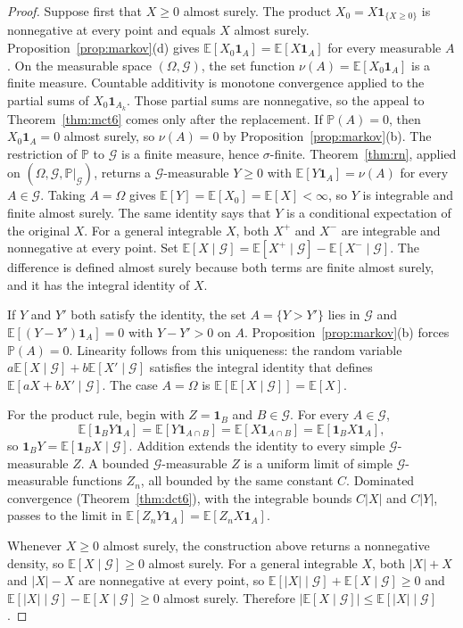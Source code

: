 \begin{proof}
Suppose first that $X\ge0$ almost surely. The product $X_0=X\mathbf 1_{\{X\ge0\}}$ is nonnegative at every point and equals $X$ almost surely. Proposition~\ref{prop:markov}(d) gives $\mathbb E[X_0\mathbf 1_A]=\mathbb E[X\mathbf 1_A]$ for every measurable $A$. On the measurable space $(\Omega,\mathcal G)$, the set function $\nu(A)=\mathbb E[X_0\mathbf 1_A]$ is a finite measure. Countable additivity is monotone convergence applied to the partial sums of $X_0\mathbf 1_{A_k}$. Those partial sums are nonnegative, so the appeal to Theorem~\ref{thm:mct6} comes only after the replacement. If $\mathbb P(A)=0$, then $X_0\mathbf 1_A=0$ almost surely, so $\nu(A)=0$ by Proposition~\ref{prop:markov}(b). The restriction of $\mathbb P$ to $\mathcal G$ is a finite measure, hence $\sigma$-finite. Theorem~\ref{thm:rn}, applied on $(\Omega,\mathcal G,\mathbb P|_{\mathcal G})$, returns a $\mathcal G$-measurable $Y\ge0$ with $\mathbb E[Y\mathbf 1_A]=\nu(A)$ for every $A\in\mathcal G$. Taking $A=\Omega$ gives $\mathbb E[Y]=\mathbb E[X_0]=\mathbb E[X]<\infty$, so $Y$ is integrable and finite almost surely. The same identity says that $Y$ is a conditional expectation of the original $X$. For a general integrable $X$, both $X^+$ and $X^-$ are integrable and nonnegative at every point. Set $\mathbb E[X\mid\mathcal G]=\mathbb E[X^+\mid\mathcal G]-\mathbb E[X^-\mid\mathcal G]$. The difference is defined almost surely because both terms are finite almost surely, and it has the integral identity of $X$.

If $Y$ and $Y'$ both satisfy the identity, the set $A=\{Y>Y'\}$ lies in $\mathcal G$ and $\mathbb E[(Y-Y')\mathbf 1_A]=0$ with $Y-Y'>0$ on $A$. Proposition~\ref{prop:markov}(b) forces $\mathbb P(A)=0$. Linearity follows from this uniqueness: the random variable $a\mathbb E[X\mid\mathcal G]+b\mathbb E[X'\mid\mathcal G]$ satisfies the integral identity that defines $\mathbb E[aX+bX'\mid\mathcal G]$. The case $A=\Omega$ is $\mathbb E[\mathbb E[X\mid\mathcal G]]=\mathbb E[X]$.

For the product rule, begin with $Z=\mathbf 1_B$ and $B\in\mathcal G$. For every $A\in\mathcal G$,
\[
\mathbb E[\mathbf 1_BY\mathbf 1_A]=\mathbb E[Y\mathbf 1_{A\cap B}]=\mathbb E[X\mathbf 1_{A\cap B}]=\mathbb E[\mathbf 1_BX\mathbf 1_A],
\]
so $\mathbf 1_BY=\mathbb E[\mathbf 1_BX\mid\mathcal G]$. Addition extends the identity to every simple $\mathcal G$-measurable $Z$. A bounded $\mathcal G$-measurable $Z$ is a uniform limit of simple $\mathcal G$-measurable functions $Z_n$, all bounded by the same constant $C$. Dominated convergence (Theorem~\ref{thm:dct6}), with the integrable bounds $C|X|$ and $C|Y|$, passes to the limit in $\mathbb E[Z_nY\mathbf 1_A]=\mathbb E[Z_nX\mathbf 1_A]$.

Whenever $X\ge0$ almost surely, the construction above returns a nonnegative density, so $\mathbb E[X\mid\mathcal G]\ge0$ almost surely. For a general integrable $X$, both $|X|+X$ and $|X|-X$ are nonnegative at every point, so $\mathbb E[|X|\mid\mathcal G]+\mathbb E[X\mid\mathcal G]\ge0$ and $\mathbb E[|X|\mid\mathcal G]-\mathbb E[X\mid\mathcal G]\ge0$ almost surely. Therefore $|\mathbb E[X\mid\mathcal G]|\le\mathbb E[|X|\mid\mathcal G]$.
\end{proof}

